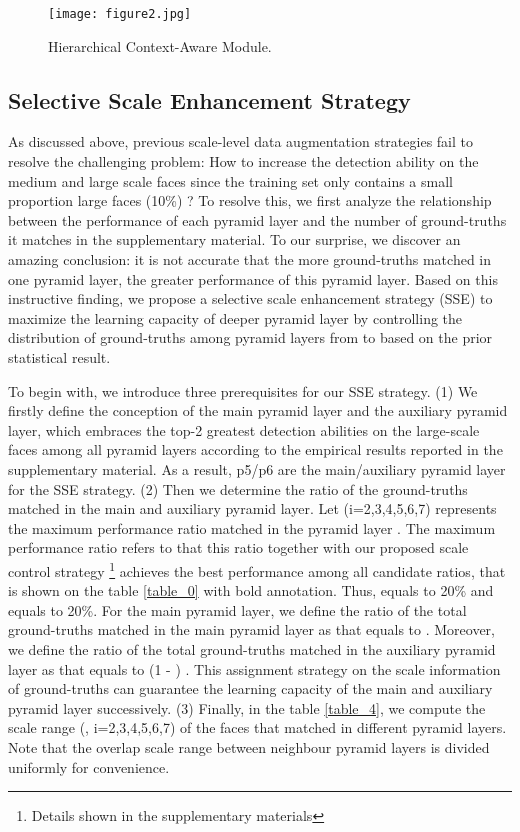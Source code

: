 \documentclass[10pt,twocolumn,letterpaper]{article}
\begin{document}
\begin{figure*}[t]
    \centering
\texttt{[image: figure2.jpg]}
    \caption{Hierarchical Context-Aware Module.}
    \label{img2}
\end{figure*}

\subsection{Selective Scale Enhancement Strategy}
As discussed above, previous scale-level data augmentation strategies fail to resolve the challenging problem: How to increase the detection ability on the medium and large scale faces since the training set only contains a small proportion large faces (10\%) ? To resolve this, we first analyze the relationship between the performance of each pyramid layer and the number of ground-truths it matches in the supplementary material. To our surprise, we discover an amazing conclusion:  it  is  not  accurate  that  the  more ground-truths matched in one pyramid layer, the greater  performance  of  this  pyramid  layer. Based on this instructive finding, we propose a selective scale enhancement strategy (SSE) to maximize the learning capacity of deeper pyramid layer by controlling the distribution of ground-truths among pyramid layers from  to  based on the prior statistical result.

To begin with, we introduce three prerequisites for our SSE strategy. 
(1) We firstly define the conception of the main pyramid layer and the auxiliary pyramid layer, which embraces the top-2 greatest detection abilities on the large-scale faces among all pyramid layers according to the empirical results reported in the supplementary material. As a result, p5/p6 are the main/auxiliary pyramid layer for the SSE strategy. 
(2) Then we determine the ratio of the ground-truths matched in the main and auxiliary pyramid layer. Let  (i=2,3,4,5,6,7) represents the maximum performance ratio matched in the pyramid layer . The maximum performance ratio refers to that this ratio together with our proposed scale control strategy \footnote{Details shown in the supplementary materials} achieves the best performance  among all candidate ratios, that is shown on the table \ref{table_0} with bold annotation. Thus,  equals to 20\%  and  equals to 20\%.  
For the main pyramid layer, we define the ratio of the total ground-truths matched in the main pyramid layer as  that equals to . Moreover, we define the  ratio of the total ground-truths matched in the auxiliary pyramid layer as  that equals to (1 - )  . This assignment strategy on the scale information of ground-truths can guarantee the learning capacity of the main and auxiliary pyramid layer successively. 
(3) Finally, in the table \ref{table_4}, we compute the scale range (, i=2,3,4,5,6,7) of the faces that matched in different pyramid layers. 
Note that the overlap scale range between neighbour pyramid layers is divided uniformly for convenience. 
\end{document}
